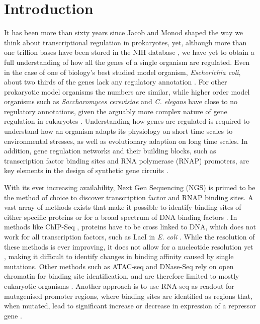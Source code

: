 \section{Introduction}
It has been more than sixty years since Jacob and Monod \cite{jacob1961genetic} shaped the way we think about transcriptional regulation in prokaryotes, yet, although more than one trillion bases have been stored in the NIH database , we have yet to obtain a full understanding of how all the genes of a single organism are regulated. Even in the case of one of biology's best studied model organism, \textit{Escherichia coli}, about two thirds of the genes lack any regulatory annotation . For other prokaryotic model organisms the numbers are similar, while higher order model organisms such as \textit{Saccharomyces cerevisiae} and \textit{C. elegans} have close to no regulatory annotations, given the arguably more complex nature of gene regulation in eukaryotes . Understanding how genes are regulated is required to understand how an organism adapts its physiology on short time scales to environmental stresses, as well as evolutionary adaption on long time scales. In addition, gene regulation networks and their building blocks, such as transcription factor binding sites and RNA polymerase (RNAP) promoters, are key elements in the design of synthetic gene circuits .

With its ever increasing availability, Next Gen Sequencing (NGS) is primed to be the method of choice to discover transcription factor and RNAP binding sites. A vast array of methods exists that make it possible to identify binding sites of either specific proteins  or for a broad spectrum of DNA binding factors . In methods like ChIP-Seq \cite{rhee2012chip}, proteins have to be cross linked to DNA, which does not work for all transcription factors, such as LacI in \textit{E. coli} . While the resolution of these methods is ever improving, it does not allow for a nucleotide resolution yet , making it difficult to identify changes in binding affinity caused by single mutations. Other methods such as ATAC-seq \cite{buenrostro2015atac, li2019identification} and DNase-Seq \cite{boyle2008high} rely on open chromatin for binding site identification, and are therefore limited to mostly eukaryotic organisms . Another approach is to use RNA-seq as readout for mutagenised promoter regions, where binding sites are identified as regions that, when mutated, lead to significant increase or decrease in expression of a repressor gene \cite{urtecho2018systematic, urtecho2020genome, ireland2020deciphering}. 

